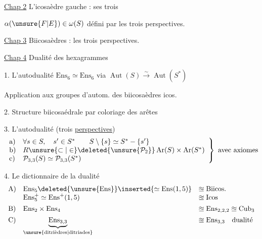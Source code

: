 \uline{Chap 2} L'icosaèdre gauche : ses trois

$\alpha(\unsure{F|E})\in\omega(S)$ défini par les trois perspectives.

\uline{Chap 3} Biicosaèdres : les trois perspectives.

\uline{Chap 4} Dualité des hexagrammes


1. L'autodualité $\mathrm{Ens}_6\simeq\mathrm{Ens}_6$
 via
$\operatorname{Aut}(S)\xrightarrow{\sim}\operatorname{Aut}(S^*)$

Application aux groupes d'autom. des
biicosaèdres  icos.

2. Structure biicosaédrale par coloriage des arêtes

3. L'autodualité (trois \uline{perspectives})
\[
\left.\begin{array}{ll}
\text{a)}&\forall s\in S,\quad s'\in S^*\qquad
 S\setminus\{s\}\simeq S^*-\{s'\}\\
\text{b)}&R\unsure{\subset|\in}\deleted{\unsure{\mathcal P_2}}
 \operatorname{Ar}(S)\times\operatorname{Ar}(S^*)\\
\text{c)}&\mathcal P_{3,3}(S)\simeq\mathcal P_{3,3}(S^*)
\end{array}\right\}\ \text{avec axiomes}
\]

4. Le dictionnaire de la dualité
\[
\begin{array}{lll}
\text{A)}&\mathrm{Ens}_5\deleted{\unsure{\mathrm{Ens}}}
 \inserted{\simeq\mathrm{Ens}(1,5)}&\approxeq\mathrm{Biicos.}\\
&\mathrm{Ens}_5^+\simeq\mathrm{Ens}^+(1,5)&\approxeq\mathrm{Icos}\\[1ex]
\text{B)}&\mathrm{Ens}_2\times\mathrm{Ens}_4
 &\approxeq\mathrm{Ens}_{2,2,2}\approxeq\mathrm{Cub}_3\\[1ex]
\text{C)}&\underbrace{\mathrm{Ens}_{3,3}}_{\text{\unsure{ditrièdres|ditriades}}}
 &\approxeq\mathrm{Ens}_{3,3}\quad\text{dualité}
\end{array}
\]


